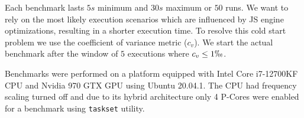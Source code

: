 
Each benchmark lasts $5s$ minimum and $30s$ maximum or $50$ runs. We want to rely on the most likely execution scenarios which are influenced by JS engine optimizations, resulting in a shorter execution time. To resolve this cold start problem we use the coefficient of variance metric ($c_v$). We start the actual benchmark after the window of $5$ executions where $c_v \le 1\permil$.


Benchmarks were performed on a platform equipped with Intel\textsuperscript{\tiny\textregistered} Core\textsuperscript{\tiny\texttrademark} i7-12700KF CPU and Nvidia 970 GTX GPU using Ubuntu 20.04.1. The CPU had frequency scaling turned off and due to its hybrid architecture only 4 P-Cores were enabled for a benchmark using \texttt{taskset} utility.
